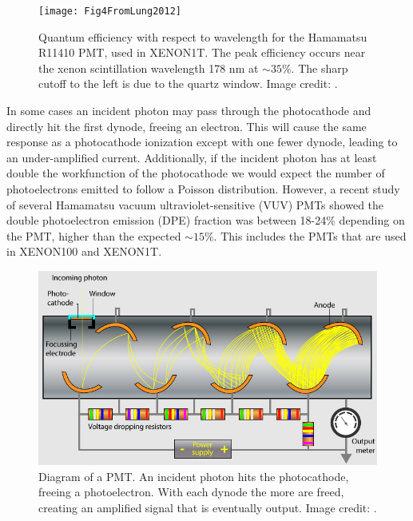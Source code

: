 \begin{figure}
\centering
\texttt{[image: Fig4FromLung2012]}
\caption{Quantum efficiency with respect to wavelength for the Hamamatsu R11410 PMT, used in XENON1T.  The peak efficiency occurs near
the xenon scintillation wavelength 178 nm at $\sim 35 \%$.  The sharp cutoff to the left is due to the quartz window.  Image credit:
.}
\label{fig:tpcs_pmts_qe}
\end{figure}

In some cases an incident photon may pass through the photocathode and directly hit the first dynode, freeing an electron.  This will
cause the same response as a photocathode ionization except with one fewer dynode, leading to an under-amplified current.  Additionally,
if the incident photon has at least double the workfunction of the photocathode we would expect the number of photoelectrons emitted to
follow a Poisson distribution.  However, a recent study of several Hamamatsu vacuum ultraviolet-sensitive (VUV) PMTs showed the double
photoelectron emission
(DPE) fraction was between 18-24\% depending on the PMT, higher than the expected $\sim 15\%$.  This includes the PMTs that are used in
XENON100 and XENON1T.

\begin{figure}
\centering
\includegraphics[width=\textwidth]{PMT1}
\caption{Diagram of a PMT.  An incident photon hits the photocathode, freeing a photoelectron.  With each dynode the more \electron are
freed, creating an amplified signal that is eventually output.  Image credit: .}
\label{fig:tpcs_pmts_pmt_diagram}
\end{figure}

